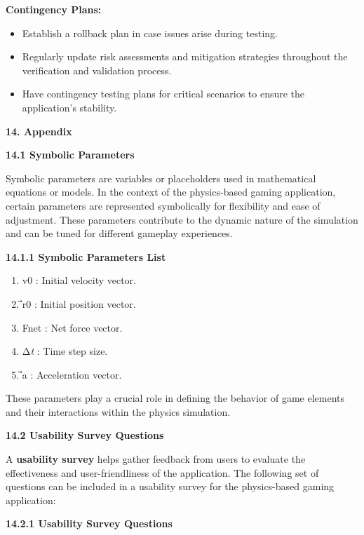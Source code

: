 \documentclass[
]{article}
\begin{document}
\textbf{Contingency Plans:}

\begin{itemize}
\item
  Establish a rollback plan in case issues arise during testing.
\item
  Regularly update risk assessments and mitigation strategies throughout
  the verification and validation process.
\item
  Have contingency testing plans for critical scenarios to ensure the
  application's stability.
\end{itemize}

\textbf{14. Appendix}

\textbf{14.1 Symbolic Parameters}

Symbolic parameters are variables or placeholders used in mathematical
equations or models. In the context of the physics-based gaming
application, certain parameters are represented symbolically for
flexibility and ease of adjustment. These parameters contribute to the
dynamic nature of the simulation and can be tuned for different gameplay
experiences.

\textbf{14.1.1 Symbolic Parameters List}

\begin{enumerate}
\def\labelenumi{\arabic{enumi}.}
\item
  v0\hspace{0pt} : Initial velocity vector.
\item
  ⃗r0 : Initial position vector.
\item
  Fnet\hspace{0pt} : Net force vector.
\item
  Δ\emph{t} : Time step size.
\item
  ⃗a : Acceleration vector.
\end{enumerate}

These parameters play a crucial role in defining the behavior of game
elements and their interactions within the physics simulation.

\textbf{14.2 Usability Survey Questions}

A \textbf{usability survey} helps gather feedback from users to evaluate
the effectiveness and user-friendliness of the application. The
following set of questions can be included in a usability survey for the
physics-based gaming application:

\textbf{14.2.1 Usability Survey Questions}
\end{document}
